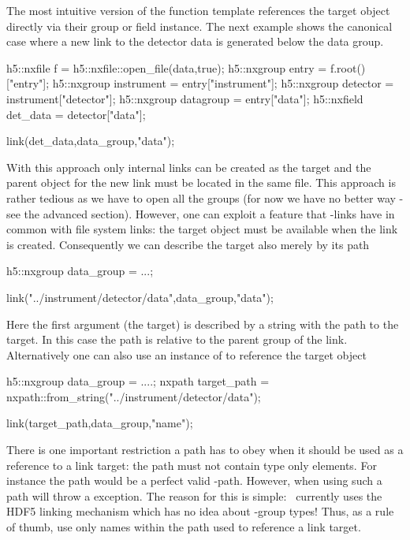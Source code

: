 The most intuitive version of the  function template references the
target object directly via their group or field instance. The next example shows
the canonical case where a new link to the detector data is generated below the
data group. 
\begin{cppcode}
h5::nxfile  f          = h5::nxfile::open_file(data,true);
h5::nxgroup entry      = f.root()["entry"];
h5::nxgroup instrument = entry["instrument"];
h5::nxgroup detector   = instrument["detector"];
h5::nxgroup datagroup  = entry["data"];
h5::nxfield det_data   = detector["data"];

link(det_data,data_group,"data");
\end{cppcode}
With this approach only internal links can be created as the target and the
parent object for the new link must be located in the same file. 
This approach is rather tedious as we have to open all the groups (for now we
have no better way - see the advanced section). However, one can exploit a
feature that \nexus-links have in common with file system links: the target
object must be available when the link is created. Consequently we can describe
the target also merely by its path
\begin{cppcode}
h5::nxgroup data_group = ...;

link("../instrument/detector/data",data_group,"data");
\end{cppcode}
Here the first argument (the target) is described by a string with the path to
the target. In this case the path is relative to the parent group of the link. 
Alternatively one can also use an instance of  to reference the 
target object
\begin{cppcode}
h5::nxgroup data_group = ....;
nxpath target_path = nxpath::from_string("../instrument/detector/data");

link(target_path,data_group,"name");
\end{cppcode}
There is one important restriction a path has to obey when it should be used as
a reference to a link target: the path must not contain type only elements. 
For instance the path  would be a
perfect valid \nexus-path. However, when using such a path  will throw
a  exception. The reason for this is simple: \libpniio\
currently uses the HDF5 linking mechanism which has no idea about \nexus-group
types!
Thus, as a rule of thumb, use only names within the path used to reference a
link target. 


